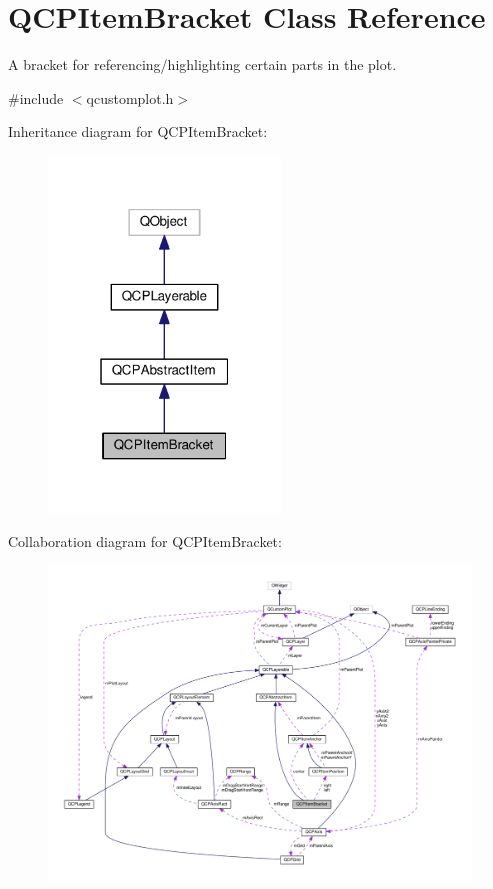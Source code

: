 \hypertarget{classQCPItemBracket}{}\section{Q\+C\+P\+Item\+Bracket Class Reference}
\label{classQCPItemBracket}


A bracket for referencing/highlighting certain parts in the plot.  




{\ttfamily \#include $<$qcustomplot.\+h$>$}



Inheritance diagram for Q\+C\+P\+Item\+Bracket\+:
\nopagebreak
\begin{figure}[H]
\begin{center}
\leavevmode
\includegraphics[width=175pt]{classQCPItemBracket__inherit__graph}
\end{center}
\end{figure}


Collaboration diagram for Q\+C\+P\+Item\+Bracket\+:
\nopagebreak
\begin{figure}[H]
\begin{center}
\leavevmode
\includegraphics[width=350pt]{classQCPItemBracket__coll__graph}
\end{center}
\end{figure}
